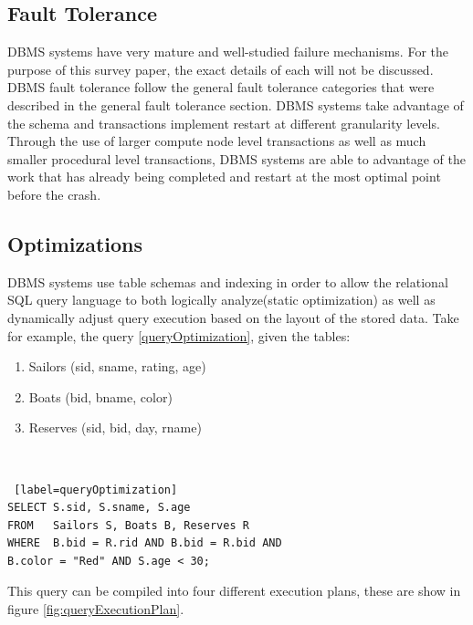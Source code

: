 \documentclass[10pt,twocolumn]{IEEEtran11}
\begin{document}
\subsection{Fault Tolerance}
DBMS systems have very mature and well-studied failure mechanisms.  For the purpose of this survey paper, the exact details of each will not be discussed.  DBMS fault tolerance follow the general fault tolerance categories that were described in the general fault tolerance section.  DBMS systems take advantage of the schema and transactions implement restart at different granularity levels.  Through the use of larger compute node level transactions as well as much smaller procedural level transactions, DBMS systems are able to 
advantage of the work that has already being completed and restart at the most optimal point before the crash.

\subsection{Optimizations}
DBMS systems use table schemas and indexing in order to allow the relational SQL query language to both logically analyze(static optimization) as well as dynamically adjust query execution based on the layout of the stored data. Take for example, the query \ref{queryOptimization}, given the tables:
\  \\
\begin{enumerate}
	\setlength\itemsep{1em}
	\item Sailors (sid, sname, rating, age)
	\item Boats (bid, bname, color)
	\item Reserves (sid, bid, day, rname)
\end{enumerate}
\  \\
\begin{lstlisting} [label=queryOptimization]
SELECT S.sid, S.sname, S.age
FROM   Sailors S, Boats B, Reserves R
WHERE  B.bid = R.rid AND B.bid = R.bid AND
B.color = "Red" AND S.age < 30;
\end{lstlisting}

This query can be compiled into four different execution plans, these are show in figure \ref{fig:queryExecutionPlan}.
\end{document}
